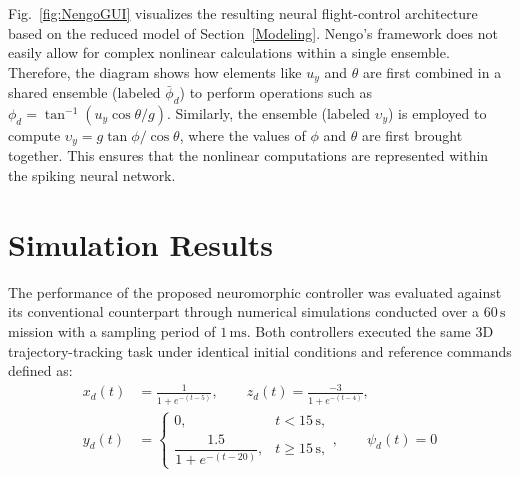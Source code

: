 \documentclass[conference]{IEEEtran}
\begin{document}

Fig.~\ref{fig:NengoGUI} visualizes the resulting neural flight-control architecture based on the reduced model of Section~\ref{Modeling}. Nengo's framework does not easily allow for complex nonlinear calculations within a single ensemble. Therefore, the diagram shows how elements like $u_y$ and $\theta$ are first combined in a shared ensemble (labeled $\bar{\phi}_d$) to perform operations such as $\phi_d = \tan^{-1}(u_y \cos\theta / g)$. Similarly, the ensemble (labeled $\upsilon_y$) is employed to compute $\upsilon_y = g \tan\phi / \cos\theta$, where the values of $\phi$ and $\theta$ are first brought together. This ensures that the nonlinear computations are represented within the spiking neural network.



\section{Simulation Results}\label{Simulations}
%
The performance of the proposed neuromorphic controller was evaluated against its conventional counterpart through numerical simulations conducted over a $60\,\mathrm{s}$ mission with a sampling period of $1\,\mathrm{ms}$. Both controllers executed the same 3D trajectory-tracking task under identical initial conditions and reference commands defined as:
%
\begin{equation}
\label{eq:mission}
\begin{aligned}
x_d(t) &= \frac{1}{1+e^{-(t-5)}}, \qquad
z_d(t) = \frac{-3}{1+e^{-(t-4)}},\\[2pt]
y_d(t) &=
\begin{cases}
0, & t < 15\,\mathrm{s},\\[2pt]
\dfrac{1.5}{1+e^{-(t-20)}}, & t \ge 15\,\mathrm{s},
\end{cases}, \qquad
\psi_d(t) = 0
\\[2pt]
\\[2pt]
\end{aligned}
\end{equation}
\end{document}
